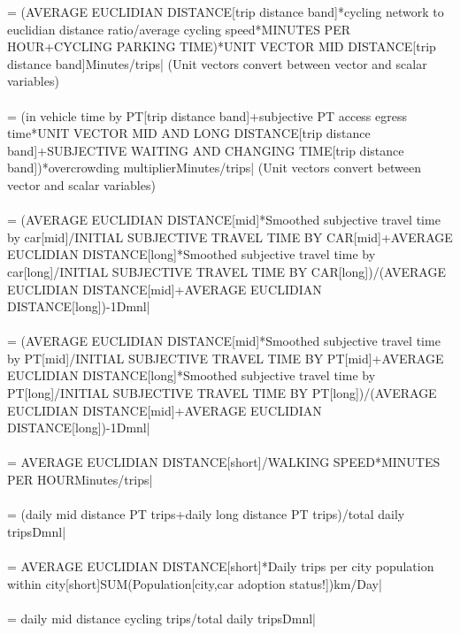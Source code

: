  = (AVERAGE EUCLIDIAN DISTANCE[trip distance band]*cycling network to euclidian distance ratio/average cycling speed*MINUTES PER HOUR+CYCLING PARKING TIME)*UNIT VECTOR MID DISTANCE[trip distance band]Minutes/trips| (Unit vectors convert between vector and scalar variables) \\ \\ 
 = (in vehicle time by PT[trip distance band]+subjective PT access egress time*UNIT VECTOR MID AND LONG DISTANCE[trip distance band]+SUBJECTIVE WAITING AND CHANGING TIME[trip distance band])*overcrowding multiplierMinutes/trips| (Unit vectors convert between vector and scalar variables) \\ \\ 
 = (AVERAGE EUCLIDIAN DISTANCE[mid]*Smoothed subjective travel time by car[mid]/INITIAL SUBJECTIVE TRAVEL TIME BY CAR[mid]+AVERAGE EUCLIDIAN DISTANCE[long]*Smoothed subjective travel time by car[long]/INITIAL SUBJECTIVE TRAVEL TIME BY CAR[long])/(AVERAGE EUCLIDIAN DISTANCE[mid]+AVERAGE EUCLIDIAN DISTANCE[long])-1Dmnl| \\ \\ 
 = (AVERAGE EUCLIDIAN DISTANCE[mid]*Smoothed subjective travel time by PT[mid]/INITIAL SUBJECTIVE TRAVEL TIME BY PT[mid]+AVERAGE EUCLIDIAN DISTANCE[long]*Smoothed subjective travel time by PT[long]/INITIAL SUBJECTIVE TRAVEL TIME BY PT[long])/(AVERAGE EUCLIDIAN DISTANCE[mid]+AVERAGE EUCLIDIAN DISTANCE[long])-1Dmnl| \\ \\ 
 = AVERAGE EUCLIDIAN DISTANCE[short]/WALKING SPEED*MINUTES PER HOURMinutes/trips| \\ \\ 
 = (daily mid distance PT trips+daily long distance PT trips)/total daily tripsDmnl| \\ \\ 
 = AVERAGE EUCLIDIAN DISTANCE[short]*Daily trips per city population within city[short]\*SUM(Population[city,car adoption status!])km/Day| \\ \\ 
 = daily mid distance cycling trips/total daily tripsDmnl| \\ \\ 
